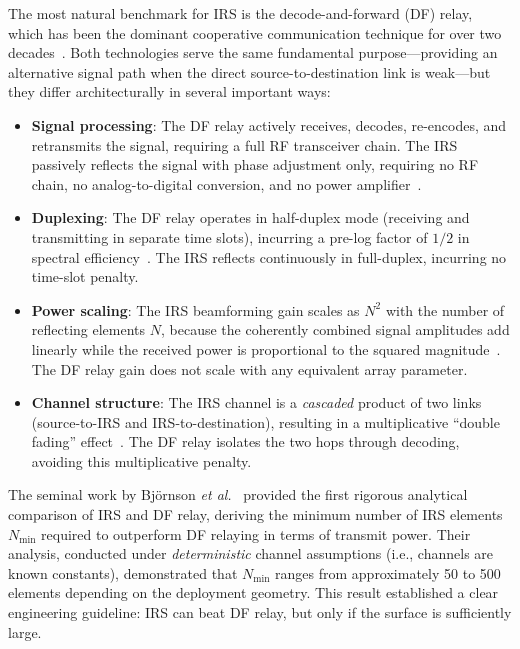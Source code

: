 \documentclass[journal]{IEEEtran} %
\begin{document}
The most natural benchmark for IRS is the decode-and-forward (DF) relay, which has been the dominant cooperative communication technique for over two decades~\cite{laneman2004cooperative,nosratinia2004cooperative}. Both technologies serve the same fundamental purpose---providing an alternative signal path when the direct source-to-destination link is weak---but they differ architecturally in several important ways:

\begin{itemize}[leftmargin=*]
    \item \textbf{Signal processing}: The DF relay actively receives, decodes, re-encodes, and retransmits the signal, requiring a full RF transceiver chain. The IRS passively reflects the signal with phase adjustment only, requiring no RF chain, no analog-to-digital conversion, and no power amplifier~\cite{wu2020irs_tutorial}.

    \item \textbf{Duplexing}: The DF relay operates in half-duplex mode (receiving and transmitting in separate time slots), incurring a pre-log factor of $1/2$ in spectral efficiency~\cite{laneman2004cooperative}. The IRS reflects continuously in full-duplex, incurring no time-slot penalty.

    \item \textbf{Power scaling}: The IRS beamforming gain scales as $N^2$ with the number of reflecting elements $N$, because the coherently combined signal amplitudes add linearly while the received power is proportional to the squared magnitude~\cite{bjornson2020irs}. The DF relay gain does not scale with any equivalent array parameter.

    \item \textbf{Channel structure}: The IRS channel is a \textit{cascaded} product of two links (source-to-IRS and IRS-to-destination), resulting in a multiplicative ``double fading'' effect~\cite{basar2019wireless,tang2020irs_pathloss}. The DF relay isolates the two hops through decoding, avoiding this multiplicative penalty.
\end{itemize}

The seminal work by Bj\"{o}rnson \textit{et al.}~\cite{bjornson2020irs} provided the first rigorous analytical comparison of IRS and DF relay, deriving the minimum number of IRS elements $N_{\mathrm{min}}$ required to outperform DF relaying in terms of transmit power. Their analysis, conducted under \textit{deterministic} channel assumptions (i.e., channels are known constants), demonstrated that $N_{\mathrm{min}}$ ranges from approximately 50 to 500 elements depending on the deployment geometry. This result established a clear engineering guideline: IRS can beat DF relay, but only if the surface is sufficiently large.
\end{document}
